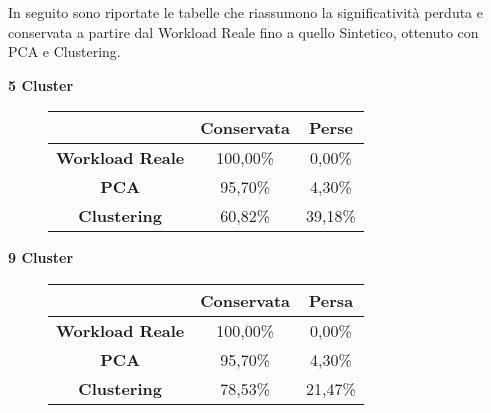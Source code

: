 \clearpage

In seguito sono riportate le tabelle che riassumono la significatività perduta e
conservata a partire dal Workload Reale fino a quello Sintetico, ottenuto con
PCA e Clustering.\\

\vspace{5 mm}
\begin{center}
  \textbf{5 Cluster}
\end{center}
\begin{figure}[!htbp]
  \centering
  \begin{tabular}{c|c|c}
   & \textbf{Conservata} & \textbf{Perse} \\
   \hline
   \textbf{Workload Reale} & 100,00\% &	0,00\% \\
   \hline
   \textbf{PCA} &	95,70\%	& 4,30\% \\
   \hline
   \textbf{Clustering} &	60,82\%	& 39,18\% \\
  \end{tabular}
\end{figure}

\vspace{5 mm}
\begin{center}
  \textbf{9 Cluster}
\end{center}
\begin{figure}[!htbp]
  \centering
  \begin{tabular}{c|c|c}
   & \textbf{Conservata} & \textbf{Persa} \\
   \hline
   \textbf{Workload Reale} & 100,00\% &	0,00\% \\
   \hline
   \textbf{PCA} &	95,70\%	& 4,30\% \\
   \hline
   \textbf{Clustering} &	78,53\%	& 21,47\% \\
  \end{tabular}
\end{figure}

\vspace{5 mm}

